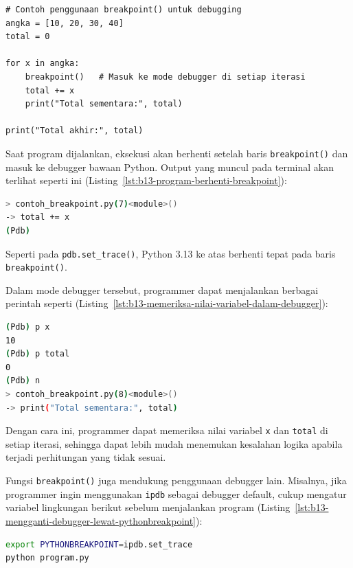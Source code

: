 \begin{lstlisting}[style=PythonStyle, caption={Contoh penggunaan breakpoint() untuk debugging}, label={lst:b13-penggunaan-breakpoint-debugging}]
# Contoh penggunaan breakpoint() untuk debugging
angka = [10, 20, 30, 40]
total = 0

for x in angka:
    breakpoint()   # Masuk ke mode debugger di setiap iterasi
    total += x
    print("Total sementara:", total)

print("Total akhir:", total)
\end{lstlisting}

Saat program dijalankan, eksekusi akan berhenti setelah baris \texttt{breakpoint()} dan masuk ke debugger bawaan Python. Output yang muncul pada terminal akan terlihat seperti ini (Listing~\ref{lst:b13-program-berhenti-breakpoint}):

\begin{lstlisting}[language=bash, caption={Program berhenti pada breakpoint()}, label={lst:b13-program-berhenti-breakpoint}]
> contoh_breakpoint.py(7)<module>()
-> total += x
(Pdb)
\end{lstlisting}

Seperti pada \texttt{pdb.set\_trace()}, Python 3.13 ke atas berhenti tepat pada baris \texttt{breakpoint()}.

Dalam mode debugger tersebut, programmer dapat menjalankan berbagai perintah seperti (Listing~\ref{lst:b13-memeriksa-nilai-variabel-dalam-debugger}):

\begin{lstlisting}[language=bash, caption={Memeriksa nilai variabel di dalam debugger}, label={lst:b13-memeriksa-nilai-variabel-dalam-debugger}]
(Pdb) p x
10
(Pdb) p total
0
(Pdb) n
> contoh_breakpoint.py(8)<module>()
-> print("Total sementara:", total)
\end{lstlisting}

Dengan cara ini, programmer dapat memeriksa nilai variabel \texttt{x} dan \texttt{total} di setiap iterasi, sehingga dapat lebih mudah menemukan kesalahan logika apabila terjadi perhitungan yang tidak sesuai.

Fungsi \texttt{breakpoint()} juga mendukung penggunaan debugger lain. Misalnya, jika programmer ingin menggunakan \texttt{ipdb} sebagai debugger default, cukup mengatur variabel lingkungan berikut sebelum menjalankan program (Listing~\ref{lst:b13-mengganti-debugger-lewat-pythonbreakpoint}):

\begin{lstlisting}[language=bash, caption={Mengganti debugger lewat PYTHONBREAKPOINT}, label={lst:b13-mengganti-debugger-lewat-pythonbreakpoint}]
export PYTHONBREAKPOINT=ipdb.set_trace
python program.py
\end{lstlisting}

